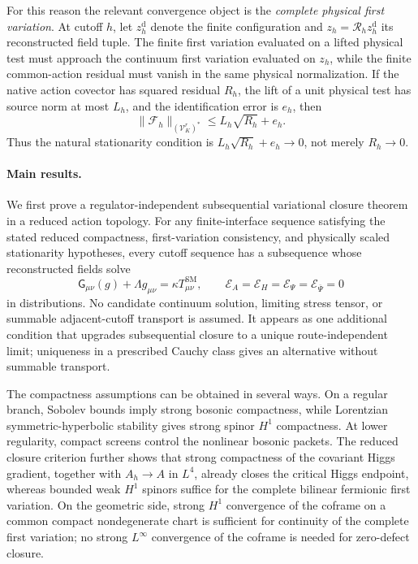 \documentclass[11pt]{article}
\numberwithin{equation}{section}
\theoremstyle{definition}
\theoremstyle{remark}
\newcommand{\norm}[1]{\lVert#1\rVert}
\newcommand{\Vtest}{\mathscr V}
\newcommand{\Eins}{\mathsf G}
\newcommand{\Evar}{\mathcal E}
\newcommand{\bPsi}{\overline\Psi}
\begin{document}
For this reason the relevant convergence object is the
\emph{complete physical first variation}.  At cutoff $h$, let
$z_h^{\mathrm d}$ denote the finite configuration and
$z_h=\mathcal R_hz_h^{\mathrm d}$ its reconstructed field tuple.  The finite
first variation evaluated on a lifted physical test must approach the
continuum first variation evaluated on $z_h$, while the finite common-action
residual must vanish in the same physical normalization.  If the native
action covector has squared residual $R_h$, the lift of a unit physical test
has source norm at most $L_h$, and the identification error is $e_h$, then
\begin{equation}
\norm{\mathcal F_h}_{(\Vtest_K^r)^*}
\le
L_h\sqrt{R_h}+e_h.
\label{eq:intro-scaled-stationarity}
\end{equation}
Thus the natural stationarity condition is
$L_h\sqrt{R_h}+e_h\to0$, not merely $R_h\to0$.

\paragraph{Main results.}

We first prove a regulator-independent subsequential variational closure
theorem in a reduced action topology.  For any finite-interface sequence satisfying the stated reduced compactness,
first-variation consistency, and physically scaled stationarity hypotheses,
every cutoff sequence has a subsequence whose reconstructed fields solve
\begin{equation}
\Eins_{\mu\nu}(g)+\Lambda g_{\mu\nu}
=
\kappa T^{\mathrm{SM}}_{\mu\nu},
\qquad
\Evar_A=\Evar_H=\Evar_\Psi=\Evar_{\bPsi}=0
\label{eq:intro-ESM-system-new}
\end{equation}
in distributions.  No candidate continuum solution, limiting stress tensor,
or summable adjacent-cutoff transport is assumed.  It appears as
one additional condition that upgrades subsequential closure to a unique
route-independent limit; uniqueness in a prescribed Cauchy class gives an
alternative without summable transport.

The compactness assumptions can be obtained in several ways.  On a regular
branch, Sobolev bounds imply strong bosonic compactness, while Lorentzian
symmetric-hyperbolic stability gives strong spinor $H^1$ compactness.  At
lower regularity, compact screens control the nonlinear bosonic packets.
The reduced closure criterion further shows that strong compactness of the
covariant Higgs gradient, together with $A_h\to A$ in $L^4$, already closes
the critical Higgs endpoint, whereas bounded weak $H^1$ spinors suffice for
the complete bilinear fermionic first variation.  On the geometric side,
strong $H^1$ convergence of the coframe on a common compact nondegenerate
chart is sufficient for continuity of the complete first variation; no
strong $L^\infty$ convergence of the coframe is needed for zero-defect closure.
\end{document}
